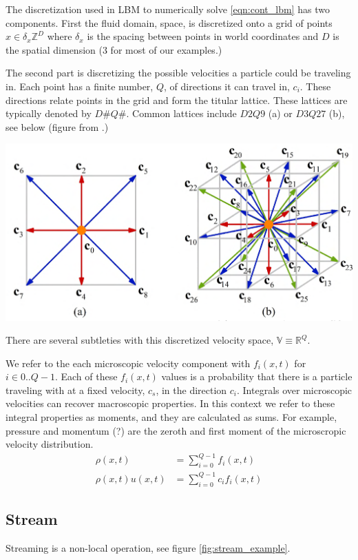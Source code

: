 The discretization used in LBM to numerically solve \ref{eqn:cont_lbm} 
has two components.
First the fluid domain, space, is 
discretized onto a
grid of points $x \in \delta_x \mathbb{Z}^D$
where $\delta_x$ is the spacing between points in world coordinates
and $D$ is the spatial dimension ($3$ for most of our examples.)

The second part is discretizing the possible velocities a particle 
could be traveling in. 
Each point has a finite number, $Q$, of directions it can travel in, $c_i$.
These directions relate points in the grid and form the titular lattice.
These lattices are typically denoted by $D\#Q\#$.
Common lattices include $D2Q9$ (a) or $D3Q27$ (b), see below (figure from \cite{Li2020}.)
\begin{center}
\includegraphics[width=0.6\linewidth]{lattice_figure.png}
\end{center}

There are several subtleties with this discretized velocity space, 
$\mathbb{V} \equiv \mathbb{R}^Q$. 
\begin{outline}
\1 We refer to the each microscopic velocity component with 
$f_i(x, t)$ for $i \in 0..Q - 1$.
\1 Each of these $f_i(x, t)$ values is a probability that there is a particle traveling with at a fixed velocity, $c_s$, in the direction $c_i$.
\1 Integrals over microscopic velocities can recover macroscopic properties.
In this context we refer to these integral properties as moments, 
and they are calculated as sums. 
For example, pressure and momentum (?) are the zeroth and first moment 
of the microscropic velocity distribution.
\begin{align}
  \rho(x, t) &= \sum_{i = 0}^{Q - 1} f_i(x, t) \\
  \rho(x,t)u(x,t) &= \sum_{i = 0}^{Q - 1}c_i f_i(x, t)
\end{align}
\end{outline}

\subsection{Stream}
Streaming is a non-local operation, see figure \ref{fig:stream_example}.

